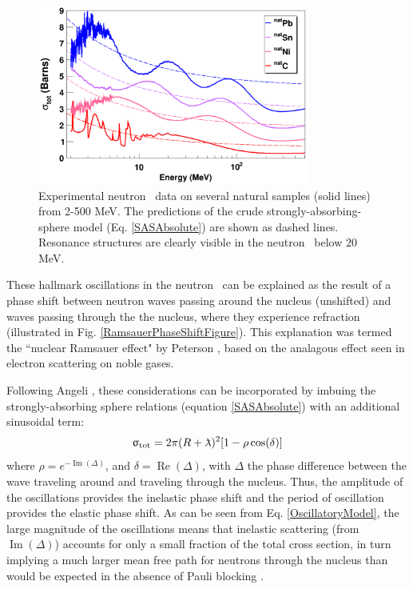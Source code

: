 \begin{figure}
    \centering
    \includegraphics[width=0.8\textwidth]{figures/SASphereVsExperiment.png}
    \caption[Experimental neutron \tot\ data and strongly-absorbing-sphere predictions]
    {
        Experimental neutron \tot\ data on several natural samples (solid lines)
        from 2-500 MeV. The predictions of the crude strongly-absorbing-sphere
        model (Eq. \ref{SASAbsolute}) are shown as dashed lines. Resonance structures are
        clearly visible in the \cNat neutron \tot\ below 20 MeV.
    }
    \label{SASphereVsExperiment}
\end{figure}

These hallmark oscillations in the neutron \tot\ can be explained as the result
of a phase shift between 
neutron waves passing around the nucleus (unshifted) and waves passing
through the the nucleus, where they experience refraction
(illustrated in Fig. \ref{RamsauerPhaseShiftFigure}). This explanation was termed the ``nuclear 
Ramsauer effect" by Peterson \cite{Peterson1962}, based on the analagous effect seen in 
electron scattering on noble gases.

Following Angeli \cite{Angeli1970}, these considerations can be incorporated by
imbuing the strongly-absorbing sphere relations (equation \ref{SASAbsolute}) with an additional sinusoidal term:
\begin{equation} \label{OscillatoryModel}
    \tot = 2\pi (R+\lambdabar)^{2}[1 - \rho \cos(\delta)]
\end{equation}
where $\rho = e^{-\operatorname{Im}(\Delta)}$, and $\delta =
\operatorname{Re}(\Delta)$, with $\Delta$ the phase difference between the wave traveling
around and traveling through the nucleus. Thus, the amplitude of the oscillations provides the 
inelastic phase shift and the period of oscillation provides the elastic phase shift.
As can be seen from Eq. \ref{OscillatoryModel}, the large magnitude of the oscillations means that 
inelastic scattering (from $\operatorname{Im}(\Delta)$) accounts for only a small fraction of the 
total cross section, in turn implying a much larger mean free path for neutrons through the nucleus 
than would be expected in the absence of Pauli blocking \cite{Mohr1955}.

